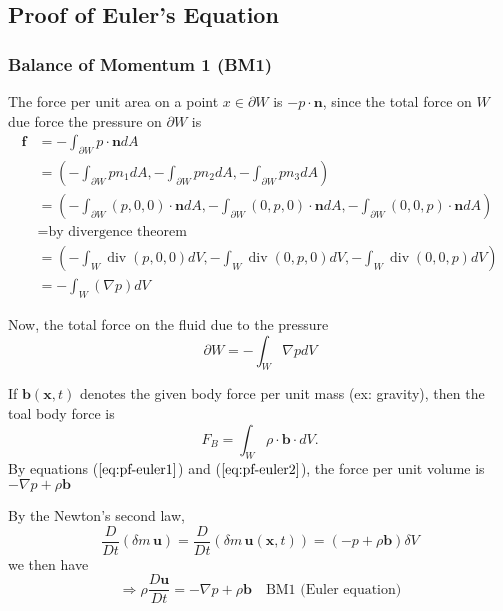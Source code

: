 \subsection{Proof of Euler's Equation} %

\subsubsection{Balance of Momentum 1 (BM1)} %

The force per unit area on a point $x\in \partial W$ is $-p\cdot \textbf{n}$, since the total force on $W$ due force the pressure on $\partial W$ is 
\begin{equation}
\begin{aligned}
\textbf{f} &= - \int_{\partial W} p\cdot \textbf{n} dA\\
&= \left(-\int_{\partial W} pn_1 dA, -\int_{\partial W} pn_2 dA, -\int_{\partial W} pn_3 dA\right)\\
&= \left(
-\int_{\partial W} (p,0,0)\cdot \textbf{n} dA,
-\int_{\partial W} (0,p,0)\cdot \textbf{n} dA,
-\int_{\partial W} (0,0,p)\cdot \textbf{n} dA\right)\\
&= \text{by divergence theorem}\\
&=\left(
-\int_{W} \operatorname{div}(p,0,0)dV,
-\int_{W} \operatorname{div}(0,p,0)dV,
-\int_{W} \operatorname{div}(0,0,p)dV\right)\\
&= - \int_{W} (\nabla p) dV
\end{aligned}
\end{equation}


Now, the total force on the fluid due to the pressure 
\begin{equation}
\partial W = -\int_{W} \nabla p dV \label{eq:pf-euler1}
\end{equation}



If $\mathbf{b}(\mathbf{x},t)$ denotes the given body force per unit mass (ex: gravity), then the toal body force is 
\begin{equation}
F_{B} = \int_{W} \rho \cdot \mathbf{b}\cdot dV.\label{eq:pf-euler2}
\end{equation}
By equations ($\ref{eq:pf-euler1}$) and ($\ref{eq:pf-euler2}$), the force per unit volume is $-\nabla p + \rho \textbf{b}$

By the Newton's second law, 
\begin{equation}
\frac{D}{Dt} (\delta m\, \mathbf{u})
= \frac{D}{Dt} (\delta m\, \mathbf{u}(\mathbf{x},t))
= (-p + \rho \textbf{b})\delta V
\end{equation}
we then have
\begin{equation}
\Rightarrow \rho \frac{D\mathbf{u}}{Dt} = - \nabla p + \rho \textbf{b} \quad \text{BM1 (Euler equation)}
\end{equation}

